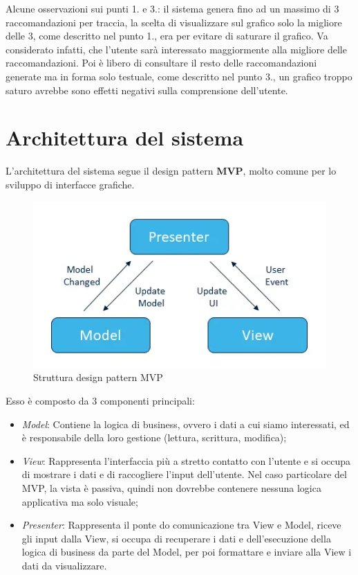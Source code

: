 Alcune osservazioni sui punti 1. e 3.: il sistema genera fino ad un massimo di 3 raccomandazioni per traccia, la scelta di visualizzare sul grafico solo la migliore delle 3, come descritto nel punto 1., era per evitare di saturare il grafico. Va considerato infatti, che l'utente sarà interessato maggiormente alla migliore delle raccomandazioni. Poi è libero di consultare il resto delle raccomandazioni generate ma in forma solo testuale, come descritto nel punto 3., un grafico troppo saturo avrebbe sono effetti negativi sulla comprensione dell'utente.


\section{Architettura del sistema}
L'architettura del sistema segue il \gls{design pattern} \textbf{MVP}, molto comune per lo sviluppo di interfacce grafiche. 


\begin{figure}[H] 
    \centering 
    \includegraphics[width=0.9\columnwidth]{immagini/mvp.png} 
    \caption{Struttura design pattern MVP \cite{site:mvp}}
    \label{fig:mvp}
\end{figure}

Esso è composto da 3 componenti principali:

\begin{itemize}

\item \textit{Model}: Contiene la logica di business, ovvero i dati a cui siamo interessati, ed è responsabile della loro gestione (lettura, scrittura, modifica);

\item \textit{View}: Rappresenta l'interfaccia più a stretto contatto con l'utente e si occupa di mostrare i dati e di raccogliere l'input dell'utente. Nel caso particolare del MVP, la vista è passiva, quindi non dovrebbe contenere nessuna logica applicativa ma solo visuale;

\item \textit{Presenter}: Rappresenta il ponte do comunicazione tra View e Model, riceve gli input dalla View, si occupa di recuperare i dati e dell'esecuzione della logica di business da parte del Model, per poi formattare e inviare alla View i dati da visualizzare.

\end{itemize}

